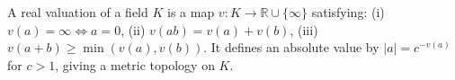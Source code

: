 A real valuation of a field $K$ is a map $v: K \to \mathbb{R} \cup \{\infty\}$ satisfying: (i) $v(a) = \infty \iff a = 0$, (ii) $v(ab) = v(a) + v(b)$, (iii) $v(a+b) \geq \min(v(a), v(b))$. It defines an absolute value by $|a| = c^{-v(a)}$ for $c > 1$, giving a metric topology on $K$.
